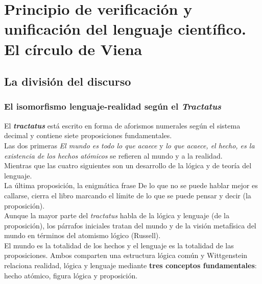 \documentclass[a4paper, 11pt, twocolumn, spanish]{article}
\begin{document}
\section{Principio de verificación y unificación del lenguaje científico. El círculo de Viena}
\label{sec:orgbd647b1}
\subsection{La división del discurso}
\label{sec:orgad0af3f}
\subsubsection{El isomorfismo lenguaje-realidad según el \emph{Tractatus}}
\label{sec:org12e1043}
El \textbf{\emph{tractatus}} está escrito en forma de aforismos numerales según el
sistema decimal y contiene siete proposiciones fundamentales.\\[0pt]
Las dos primeras \emph{El mundo es todo lo que acaece} y \emph{lo que acaece, el
hecho, es la existencia de los hechos atómicos} se refieren al mundo y
a la realidad.\\[0pt]
Mientras que las cuatro siguientes son un desarrollo de la lógica y de
teoría del lenguaje.\\[0pt]
La última proposición, la enigmática frase De lo que no se puede
hablar mejor es callarse, cierra el libro marcando el límite de lo que
se puede pensar y decir (la proposición).\\[0pt]
Aunque la mayor parte del \emph{tractatus} habla de la lógica y lenguaje (de
la proposición), los párrafos iniciales tratan del mundo y de la
visión metafísica del mundo en términos del atomismo lógico
(Russell).\\[0pt]
El mundo es la totalidad de los hechos y el lenguaje es la totalidad
de las proposiciones. Ambos comparten una estructura lógica común y
Wittgenstein relaciona realidad, lógica y lenguaje mediante \textbf{tres
conceptos fundamentales}: hecho atómico, figura lógica y
proposición.\\[0pt]
\end{document}
